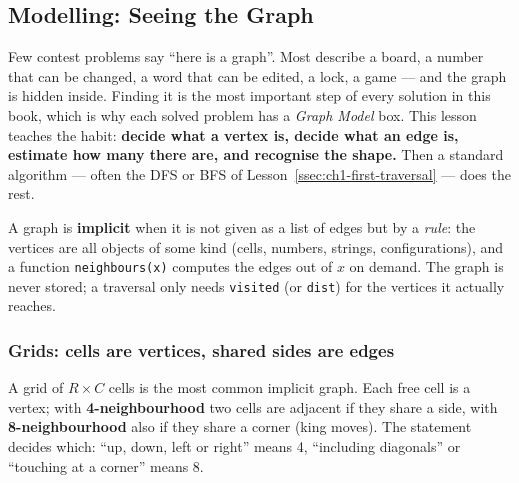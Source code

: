 \subsection{Modelling: Seeing the Graph}
\label{ssec:ch1-modelling}

Few contest problems say ``here is a graph''. Most describe a board, a number that can be changed, a word that can be edited, a lock, a game --- and the graph is hidden inside. Finding it is the most important step of every solution in this book, which is why each solved problem has a \emph{Graph Model} box. This lesson teaches the habit: \textbf{decide what a vertex is, decide what an edge is, estimate how many there are, and recognise the shape.} Then a standard algorithm --- often the DFS or BFS of Lesson~\ref{ssec:ch1-first-traversal} --- does the rest.

\begin{definitionbox}
A graph is \textbf{implicit} when it is not given as a list of edges but by a \emph{rule}: the vertices are all objects of some kind (cells, numbers, strings, configurations), and a function \texttt{neighbours(x)} computes the edges out of $x$ on demand. The graph is never stored; a traversal only needs \texttt{visited} (or \texttt{dist}) for the vertices it actually reaches.
\end{definitionbox}

\subsubsection*{Grids: cells are vertices, shared sides are edges}

A grid of $R\times C$ cells is the most common implicit graph. Each free cell is a vertex; with \textbf{4-neighbourhood} two cells are adjacent if they share a side, with \textbf{8-neighbourhood} also if they share a corner (king moves). The statement decides which: ``up, down, left or right'' means 4, ``including diagonals'' or ``touching at a corner'' means 8.

